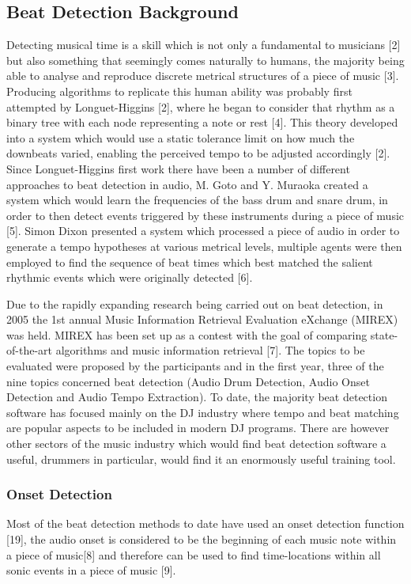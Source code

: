 \documentclass[a4paper, 11pt]{article}
\begin{document}
\subsection{Beat Detection Background}

Detecting musical time is a skill which is not only a fundamental to musicians [2] but also something that seemingly comes naturally to humans, the majority being able to analyse and reproduce discrete metrical structures of a piece of music [3]. Producing algorithms to replicate this human ability was probably first attempted by Longuet-Higgins [2], where he began to consider that rhythm as a binary tree with each node representing a note or rest [4]. This theory developed into a system which would use a static tolerance limit on how much the downbeats varied, enabling the perceived tempo to be adjusted accordingly [2]. Since Longuet-Higgins first work there have been a number of different approaches to beat detection in audio, M. Goto and Y. Muraoka created a system which would learn the frequencies of the bass drum and snare drum, in order to then detect events triggered by these instruments during a piece of music [5]. Simon Dixon presented a system which processed a piece of audio in order to generate a tempo hypotheses at various metrical levels, multiple agents were then employed to find the sequence of beat times which best matched the salient rhythmic events which were originally detected [6].

Due to the rapidly expanding research being carried out on beat detection, in 2005 the 1st annual Music Information Retrieval Evaluation eXchange (MIREX) was held. MIREX has been set up as a contest with the goal of comparing state-of-the-art algorithms and music information retrieval [7]. The topics to be evaluated were proposed by the participants and in the first year, three of the nine topics concerned beat detection (Audio Drum Detection, Audio Onset Detection and Audio Tempo Extraction). To date, the majority beat detection software has focused mainly on the DJ industry where tempo and beat matching are popular aspects to be included in modern DJ programs. There are however other sectors of the music industry which would find beat detection software a useful, drummers in particular, would find it an enormously useful training tool.

\subsubsection{Onset Detection}
Most of the beat detection methods to date have used an onset detection function [19], the audio onset is considered to be the beginning of each music note within a piece of music[8] and therefore can be used to find time-locations within all sonic events in a piece of music [9]. 
\end{document}
